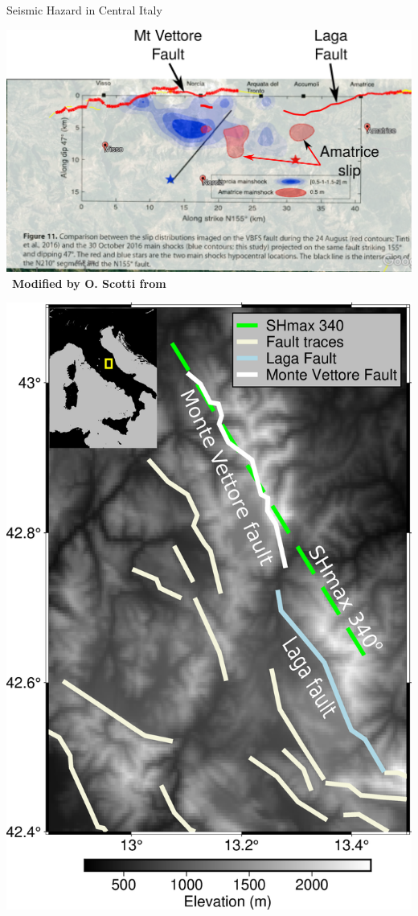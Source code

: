 \documentclass{beamer}
\begin{document}
\begin{frame}
 {Seismic Hazard in Central Italy}
 
 \begin{center}
 \begin{center}
 \begin{minipage}{0.65\linewidth}
  \includegraphics[width=1\linewidth]{images/amatrice_2.pdf} \,
  \vskip 0.2cm
  {\bf \tiny Modified by O. Scotti from \cite{Scognamiglio_2018_CFG}} \end{minipage}
 \begin{minipage}{0.33\linewidth}
  \includegraphics[width=1\linewidth]{images/Map_Italy.png}  

\end{minipage}
\end{center}
\end{center}
\end{frame}
\end{document}
